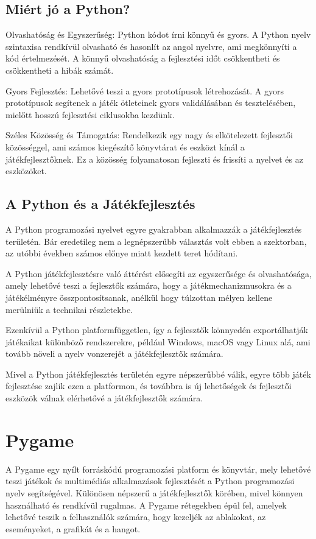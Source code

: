 \subsection{Miért jó a Python?}
Olvashatóság és Egyszerűség:
Python kódot írni könnyű és gyors. A Python nyelv szintaxisa rendkívül olvasható és hasonlít az angol nyelvre, ami megkönnyíti a kód értelmezését. A könnyű olvashatóság a fejlesztési időt csökkentheti és csökkentheti a hibák számát.

Gyors Fejlesztés:
Lehetővé teszi a gyors prototípusok létrehozását. A gyors prototípusok segítenek a játék ötleteinek gyors validálásában és tesztelésében, mielőtt hosszú fejlesztési ciklusokba kezdünk.

Széles Közösség és Támogatás:
Rendelkezik egy nagy és elkötelezett fejlesztői közösséggel, ami számos kiegészítő könyvtárat és eszközt kínál a játékfejlesztőknek. Ez a közösség folyamatosan fejleszti és frissíti a nyelvet és az eszközöket.


\subsection{A Python és a Játékfejlesztés}
A Python programozási nyelvet egyre gyakrabban alkalmazzák a játékfejlesztés területén. Bár eredetileg nem a legnépszerűbb választás volt ebben a szektorban, az utóbbi években számos előnye miatt kezdett teret hódítani.

A Python játékfejlesztésre való áttérést elősegíti az egyszerűsége és olvashatósága, amely lehetővé teszi a fejlesztők számára, hogy a játékmechanizmusokra és a játékélményre összpontosítsanak, anélkül hogy túlzottan mélyen kellene merülniük a technikai részletekbe.

Ezenkívül a Python platformfüggetlen, így a fejlesztők könnyedén exportálhatják játékaikat különböző rendszerekre, például Windows, macOS vagy Linux alá, ami tovább növeli a nyelv vonzerejét a játékfejlesztők számára.

Mivel a Python játékfejlesztés területén egyre népszerűbbé válik, egyre több játék fejlesztése zajlik ezen a platformon, és továbbra is új lehetőségek és fejlesztői eszközök válnak elérhetővé a játékfejlesztők számára.

\section{Pygame}
A Pygame egy nyílt forráskódú programozási platform és könyvtár, mely lehetővé teszi játékok és multimédiás alkalmazások fejlesztését a Python programozási nyelv segítségével. Különösen népszerű a játékfejlesztők körében, mivel könnyen használható és rendkívül rugalmas. A Pygame rétegekben épül fel, amelyek lehetővé teszik a felhasználók számára, hogy kezeljék az ablakokat, az eseményeket, a grafikát és a hangot.
